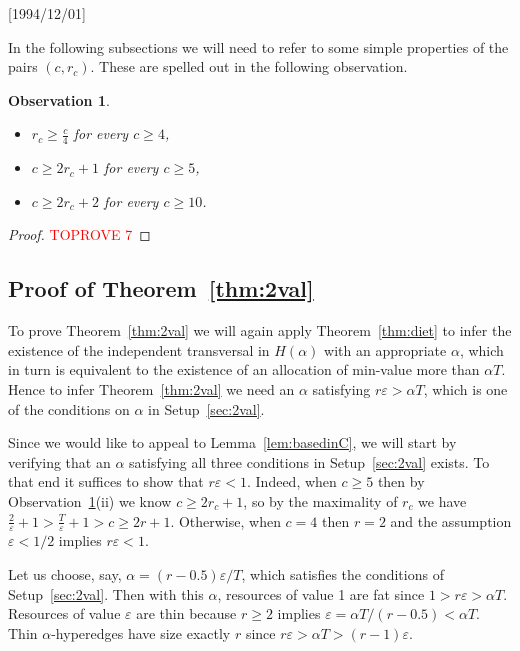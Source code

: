 \NeedsTeXFormat{LaTeX2e}[1994/12/01]\documentclass[letterpaper, 11pt]{article}
\newtheorem{obs}[thm]{Observation}
\theoremstyle{definition}
\theoremstyle{remark}
\numberwithin{equation}{section}
\newcommand{\veps}{\varepsilon}
\begin{document}
In the following subsections we will need to refer to some simple properties of
the pairs $(c,r_c)$. These are spelled out in the following observation.
\begin{obs}\label{obs:crc}
  \begin{itemize}
  \item[(i)] $r_c\geq\frac{c}4$ for every $c\geq 4$,
  \item[(ii)] $c\geq 2r_c+1$ for every $c\geq 5$,
  \item[(iii)] $c\geq 2r_c+2$ for every $c\geq 10$.
  \end{itemize}
\end{obs}
\begin{proof}\textcolor{red}{TOPROVE 7}\end{proof}



\subsection{Proof of Theorem~\ref{thm:2val}}\label{ineq}

To prove Theorem~\ref{thm:2val} we will again apply Theorem~\ref{thm:diet} to infer
the existence of the independent transversal in $H(\alpha)$ with an appropriate $\alpha$, which in turn is equivalent to the existence of an allocation of min-value more than $\alpha T$. Hence to infer Theorem~\ref{thm:2val} we need an $\alpha$  satisfying  $r\veps  > \alpha T$, which is one of the conditions on $\alpha$ in Setup~\ref{sec:2val}. 


Since we would like to appeal to Lemma~\ref{lem:basedinC}, we will start by verifying that an $\alpha$ satisfying all three conditions in Setup~\ref{sec:2val} exists. To that end it suffices to show that $r\veps < 1$. Indeed, when $c\geq 5$ then 
by Observation~\ref{obs:crc}(ii) we know $c\geq 2r_c+1$,
so by the maximality of $r_c$ we have  $\frac{2}{\varepsilon}+1>\frac{T}{\varepsilon}+1>c\geq 2r+1$. 
Otherwise, when $c=4$ then $r=2$ and the assumption $\varepsilon<1/2$
implies  $r\varepsilon<1$. 

Let us choose, say, $\alpha = (r-0.5)\veps/T$, which satisfies the conditions of Setup~\ref{sec:2val}. 
Then with this $\alpha$, resources of value 1 are fat since $1 > r\veps > \alpha T $. Resources of value $\veps$ are thin because $r\geq 2$ implies $\veps =\alpha T/(r-0.5)<\alpha T$. Thin $\alpha$-hyperedges have size exactly $r$ since $r\veps > \alpha T>(r-1)\veps$.
\end{document}
